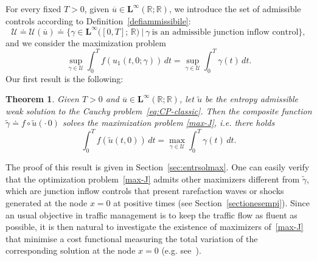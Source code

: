\documentclass[a4paper, 10pt, final]{article}
\newtheorem{theorem}{Theorem}[section]
\newcommand{\R}{\mathbb{R}} \newcommand{\N}{\mathbb{N}}
\begin{document}
For every fixed $T>0$, given $\overline u\in 
  \mathbf{L^\infty}(\R;\R)$,
we introduce the set of admissible controls according to Definition~\ref{defiammissibile}:
\begin{equation}\label{controlli}
 \mathcal{U}\doteq  \mathcal{U}(\overline u)\doteq   \Big\{ \gamma\in  \mathbf{L^\infty}
 \big([0,T];\, \R
 \big)
\ \big| \    \gamma\ \textrm{is an   admissible junction inflow  control}     
    \Big\}, \end{equation} 
and we  consider the  maximization problem
\begin{equation}
  \label{max-J}
  \sup_{\gamma \in {\mathcal{U}}} \int_0^T 
  f(u_1(t, 0;\gamma))\, dt 
  = \sup_{\gamma \in {\mathcal{U}}} \int_0^T   \gamma(t) \,  dt.
\end{equation}
Our first result is the following:
\begin{theorem} 
  \label{maxtheo1} 
  Given $T>0$ and $\overline u\in \mathbf{L^\infty}(\R;\R)$, 
  let $\widetilde u$ be the entropy admissible weak solution
  to the Cauchy problem~\eqref{eq:CP-classic}. Then the composite function  
  $\widetilde\gamma\doteq f\circ \widetilde u (\cdot\,0)$ solves the maximization problem \eqref{max-J},
  i.e. there holds   
  \begin{equation*}
    \int_0^T f(\widetilde u(t,0)) \, dt =
    \max_{\gamma \in {\mathcal{U}}} \int_0^T \gamma(t) \, dt.
  \end{equation*}
\end{theorem} 
The proof of   this result is given in 
Section~\ref{sec:entrsolmax}.
One can easily verify that the optimization problem~\eqref{max-J} admits other maximizers different from $\widetilde\gamma$, 
which are
junction inflow controls that present
rarefaction waves or shocks generated at the node $x=0$ at positive times (see Section~\ref{sectionesempi}). 
Since an usual objective in traffic management 
is to keep the traffic flow as fluent as possible, 
it is then natural 
to investigate the existence of maximizers
of~\eqref{max-J} that minimise a cost functional
measuring the total variation of the corresponding solution at the node $x=0$
(e.g. see~\cite{accg,cgr}).
\end{document}
